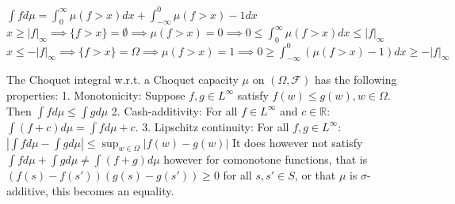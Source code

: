 \documentclass[11pt,a4paper,twoside]{article}
\begin{document}
\( \int f d\mu = \int_{0}^\infty \mu(f > x)dx + \int_{-\infty}^0 \mu(f > x) - 1 dx \)
\(x \ge |f|_\infty \implies \{f > x\} = \emptyset \implies \mu(f > x) = 0 \implies 0 \le \int_0^\infty \mu(f > x) dx \le |f|_\infty\)
\(x \le -|f|_\infty \implies \{f > x\} = \Omega \implies \mu(f > x) = 1 \implies 0 \ge \int_{-\infty}^0 (\mu(f > x) - 1) dx \ge -|f|_\infty\)

The Choquet integral w.r.t. a Choquet capacity \(\mu\) on \((\Omega, \mathcal{F})\) has the following properties:
1. Monotonicity: Suppose \(f, g \in L^\infty\) satisfy \(f(w) \le g(w), w \in \Omega\). Then
\(\int f d \mu \le \int g d \mu\)
2. Cash-additivity: For all \(f \in L^\infty\) and \(c \in \mathbb{R}\):
\(\int (f + c) d \mu = \int f d \mu + c.\)
3. Lipschitz continuity: For all \(f, g \in L^\infty\):
\(|\int f d \mu - \int g d \mu| \le \sup_{w \in \Omega} |f(w) - g(w)|\)
It does however not satisfy
\( \int fd\mu + \int g d\mu \neq \int (f + g) d\mu \)
however for comonotone functions, that is \( (f(s) - f(s'))(g(s) - g(s')) \geq 0 \) for all \( s, s' \in S \),
or that \( \mu \) is \( \sigma \)-additive, this becomes an equality.
\end{document}
